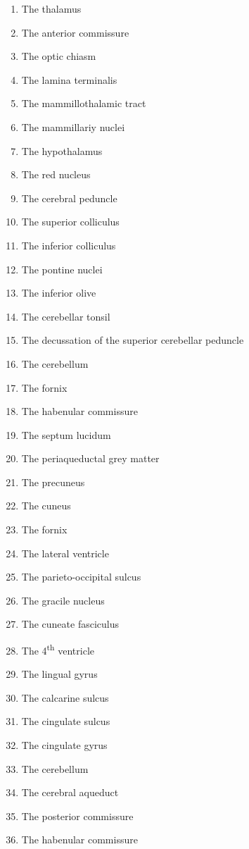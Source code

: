 \documentclass[]{book}
\providecommand{\tightlist}{%
  \setlength{\itemsep}{0pt}\setlength{\parskip}{0pt}}
\begin{document}
\begin{enumerate}
\def\labelenumi{\arabic{enumi}.}
\tightlist
\item
  The thalamus
\item
  The anterior commissure
\item
  The optic chiasm
\item
  The lamina terminalis
\item
  The mammillothalamic tract
\item
  The mammillariy nuclei
\item
  The hypothalamus
\item
  The red nucleus
\item
  The cerebral peduncle
\item
  The superior colliculus
\item
  The inferior colliculus
\item
  The pontine nuclei
\item
  The inferior olive
\item
  The cerebellar tonsil
\item
  The decussation of the superior cerebellar peduncle
\item
  The cerebellum
\item
  The fornix
\item
  The habenular commissure
\item
  The septum lucidum
\item
  The periaqueductal grey matter
\item
  The precuneus
\item
  The cuneus
\item
  The fornix
\item
  The lateral ventricle
\item
  The parieto-occipital sulcus
\item
  The gracile nucleus
\item
  The cuneate fasciculus
\item
  The 4\textsuperscript{th} ventricle
\item
  The lingual gyrus
\item
  The calcarine sulcus
\item
  The cingulate sulcus
\item
  The cingulate gyrus
\item
  The cerebellum
\item
  The cerebral aqueduct
\item
  The posterior commissure
\item
  The habenular commissure
\end{enumerate}
\end{document}
